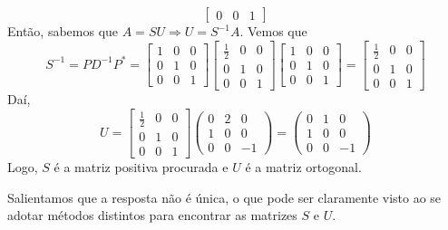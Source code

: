 \documentclass[11pt,a4paper]{article}
\begin{document}
{\begin{itemize}
\[\begin{bmatrix}
0 & 0 & 1
\end{bmatrix}
\]
Então, sabemos que $A = SU \Rightarrow U = S^{-1}A.$ Vemos que
\[
S^{-1} = PD^{-1}P^{*} = \begin{bmatrix}
1 & 0 & 0 \\
0 & 1 & 0 \\
0 & 0 & 1
\end{bmatrix} \begin{bmatrix}
\frac{1}{2} & 0 & 0 \\
0 & 1 & 0 \\
0 & 0 & 1
\end{bmatrix} \begin{bmatrix}
1 & 0 & 0 \\
0 & 1 & 0 \\
0 & 0 & 1
\end{bmatrix} =  \begin{bmatrix}
\frac{1}{2} & 0 & 0 \\
0 & 1 & 0 \\
0 & 0 & 1
\end{bmatrix}
\]
Daí,
\[
U = \begin{bmatrix}
\frac{1}{2} & 0 & 0 \\
0 & 1 & 0 \\
0 & 0 & 1
\end{bmatrix} \left(\begin{array}{ccc}
0 & 2 & 0  \\
1 & 0 & 0  \\
0 & 0 & -1
\end{array} \right) =  \left(\begin{array}{ccc}
0 & 1 & 0  \\
1 & 0 & 0  \\
0 & 0 & -1
\end{array} \right)
\]
Logo, $S$ é a matriz positiva procurada e $U$ é a matriz ortogonal.
\end{itemize}
Salientamos que a resposta não é única, o que pode ser claramente visto ao se adotar métodos distintos para encontrar as matrizes $S$ e $U.$
}
\end{document}
